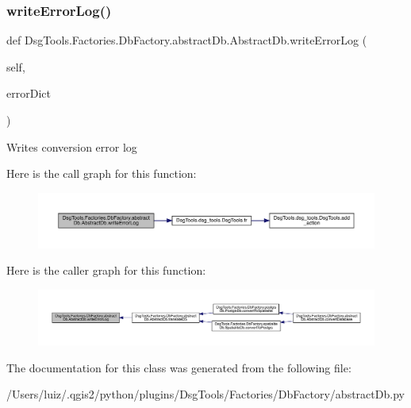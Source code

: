 \subsubsection{\texorpdfstring{write\+Error\+Log()}{writeErrorLog()}}
{\footnotesize\ttfamily def Dsg\+Tools.\+Factories.\+Db\+Factory.\+abstract\+Db.\+Abstract\+Db.\+write\+Error\+Log (\begin{DoxyParamCaption}\item[{}]{self,  }\item[{}]{error\+Dict }\end{DoxyParamCaption})}

\begin{DoxyVerb}Writes conversion error log
\end{DoxyVerb}
 Here is the call graph for this function\+:
\nopagebreak
\begin{figure}[H]
\begin{center}
\leavevmode
\includegraphics[width=350pt]{class_dsg_tools_1_1_factories_1_1_db_factory_1_1abstract_db_1_1_abstract_db_ab88ed94d88287d77c62271610d411494_cgraph}
\end{center}
\end{figure}
Here is the caller graph for this function\+:
\nopagebreak
\begin{figure}[H]
\begin{center}
\leavevmode
\includegraphics[width=350pt]{class_dsg_tools_1_1_factories_1_1_db_factory_1_1abstract_db_1_1_abstract_db_ab88ed94d88287d77c62271610d411494_icgraph}
\end{center}
\end{figure}


The documentation for this class was generated from the following file\+:\begin{DoxyCompactItemize}
\item 
/\+Users/luiz/.\+qgis2/python/plugins/\+Dsg\+Tools/\+Factories/\+Db\+Factory/abstract\+Db.\+py\end{DoxyCompactItemize}

